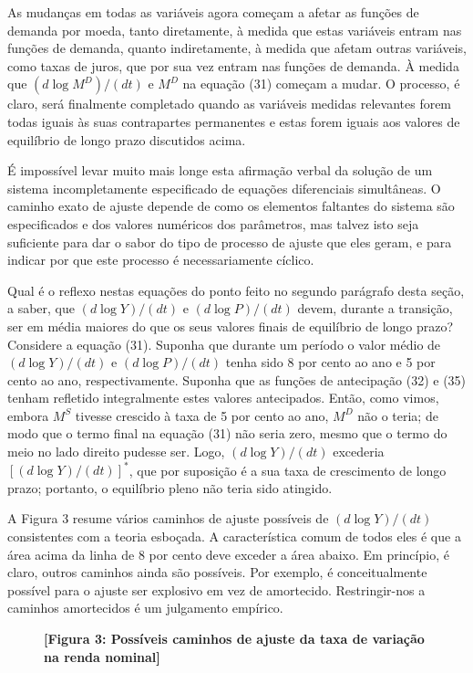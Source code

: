 \documentclass[12pt]{article}
\begin{document}
As mudanças em todas as variáveis agora começam a afetar as funções de demanda por moeda, tanto diretamente, à medida que estas variáveis entram nas funções de demanda, quanto indiretamente, à medida que afetam outras variáveis, como taxas de juros, que por sua vez entram nas funções de demanda. À medida que $(d \log M^D)/(dt)$ e $M^D$ na equação (31) começam a mudar. O processo, é claro, será finalmente completado quando as variáveis medidas relevantes forem todas iguais às suas contrapartes permanentes e estas forem iguais aos valores de equilíbrio de longo prazo discutidos acima.

É impossível levar muito mais longe esta afirmação verbal da solução de um sistema incompletamente especificado de equações diferenciais simultâneas. O caminho exato de ajuste depende de como os elementos faltantes do sistema são especificados e dos valores numéricos dos parâmetros, mas talvez isto seja suficiente para dar o sabor do tipo de processo de ajuste que eles geram, e para indicar por que este processo é necessariamente cíclico.

Qual é o reflexo nestas equações do ponto feito no segundo parágrafo desta seção, a saber, que $(d \log Y)/(dt)$ e $(d \log P)/(dt)$ devem, durante a transição, ser em média maiores do que os seus valores finais de equilíbrio de longo prazo? Considere a equação (31). Suponha que durante um período o valor médio de $(d \log Y)/(dt)$ e $(d \log P)/(dt)$ tenha sido 8 por cento ao ano e 5 por cento ao ano, respectivamente. Suponha que as funções de antecipação (32) e (35) tenham refletido integralmente estes valores antecipados. Então, como vimos, embora $M^S$ tivesse crescido à taxa de 5 por cento ao ano, $M^D$ não o teria; de modo que o termo final na equação (31) não seria zero, mesmo que o termo do meio no lado direito pudesse ser. Logo, $(d \log Y)/(dt)$ excederia $[(d \log Y)/(dt)]^*$, que por suposição é a sua taxa de crescimento de longo prazo; portanto, o equilíbrio pleno não teria sido atingido.

A Figura 3 resume vários caminhos de ajuste possíveis de $(d \log Y)/(dt)$ consistentes com a teoria esboçada. A característica comum de todos eles é que a área acima da linha de 8 por cento deve exceder a área abaixo. Em princípio, é claro, outros caminhos ainda são possíveis. Por exemplo, é conceitualmente possível para o ajuste ser explosivo em vez de amortecido. Restringir-nos a caminhos amortecidos é um julgamento empírico.

\begin{figure}[h]
\centering
\textbf{[Figura 3: Possíveis caminhos de ajuste da taxa de variação na renda nominal]}
\end{figure}
\end{document}
